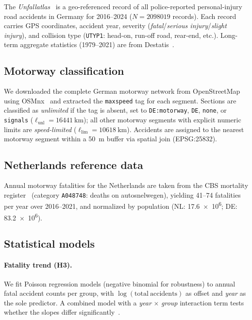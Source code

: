 \documentclass[aps,prl,twocolumn,superscriptaddress,longbibliography]{revtex4-2}
\begin{document}
The \textit{Unfallatlas}~\cite{Destatis2024} is a geo-referenced record of all
police-reported personal-injury road accidents in Germany for
2016--2024 ($N = \num{2098019}$ records).
Each record carries GPS coordinates, accident year, severity
(\textit{fatal}/\textit{serious injury}/\textit{slight injury}), and collision
type (\texttt{UTYP1}: head-on, run-off road, rear-end, etc.).
Long-term aggregate statistics (1979--2021) are from Destatis~\cite{Destatis2024}.

\subsection{Motorway classification}

We downloaded the complete German motorway network from OpenStreetMap using
OSMnx~\cite{Boeing2017} and extracted the \texttt{maxspeed} tag for each segment.
Sections are classified as \emph{unlimited} if the tag is absent, set to
\texttt{DE:motorway}, \texttt{DE}, \texttt{none}, or \texttt{signals}
($\ell_\mathrm{unl} = \SI{16441}{\kilo\metre}$); all other motorway segments with
explicit numeric limits are \emph{speed-limited}
($\ell_\mathrm{lim} = \SI{10618}{\kilo\metre}$).
Accidents are assigned to the nearest motorway segment within a
\SI{50}{\metre} buffer via spatial join (EPSG:25832).

\subsection{Netherlands reference data}

Annual motorway fatalities for the Netherlands are taken from the CBS mortality
register~\cite{CBS2024} (category \texttt{A048748}: deaths on autosnelwegen),
yielding 41--74 fatalities per year over 2016--2021, and normalized by population
(NL: \num{17.6e6}; DE: \num{83.2e6}).

\subsection{Statistical models}

\paragraph{Fatality trend (H3).}
We fit Poisson regression models (negative binomial for robustness) to annual
fatal accident counts per group, with $\log(\mathrm{total\ accidents})$ as offset
and \textit{year} as the sole predictor.
A combined model with a \textit{year} $\times$ \textit{group} interaction term
tests whether the slopes differ significantly~\cite{Johansson1996}.
\end{document}
